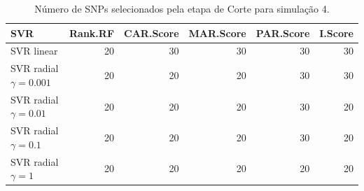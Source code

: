 \begin{table}[ht]
\centering
\begin{tabular}{lrrrrr}
  \hline
SVR & Rank.RF & CAR.Score & MAR.Score & PAR.Score & I.Score \\ 
  \hline
SVR linear & 20 & 30 & 30 & 30 & 30 \\ 
  SVR radial $\gamma = 0.001$ & 20 & 20 & 20 & 30 & 30 \\ 
  SVR radial $\gamma = 0.01$ & 20 & 20 & 20 & 30 & 20 \\ 
  SVR radial $\gamma = 0.1$ & 20 & 20 & 20 & 30 & 20 \\ 
  SVR radial $\gamma = 1$ & 20 & 20 & 20 & 20 & 20 \\ 
   \hline
\end{tabular}
\caption{Número de SNPs selecionados pela etapa de Corte para simulação 4.} 
\end{table}
